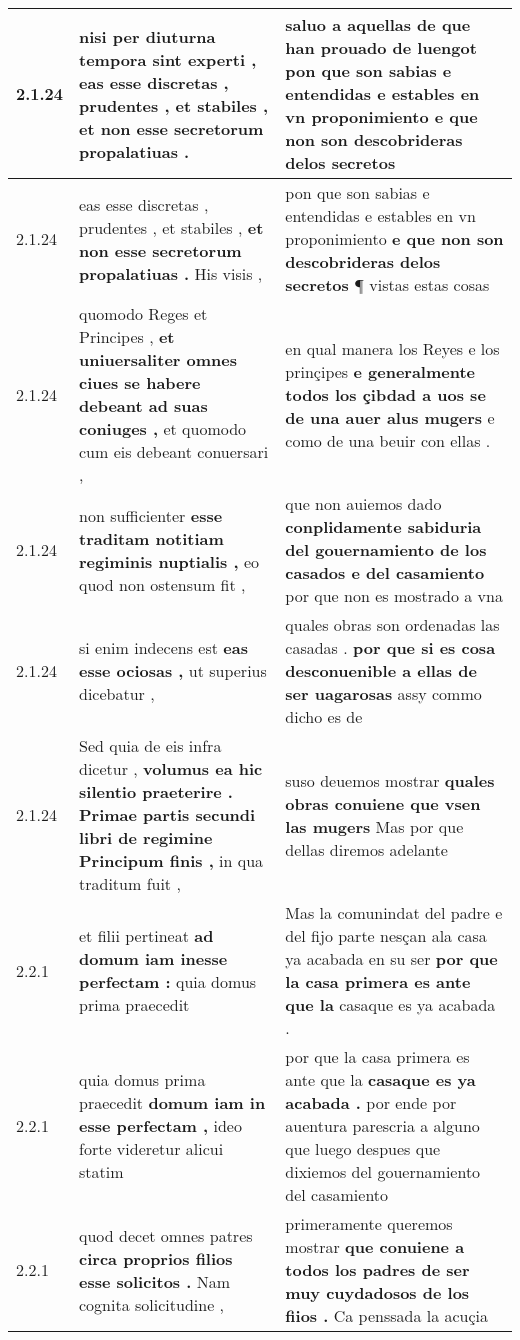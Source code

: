 \begin{tabular}{|p{1cm}|p{6.5cm}|p{6.5cm}|}
2.1.24 & nisi per diuturna tempora sint experti , \textbf{ eas esse discretas , prudentes , et stabiles , } et non esse secretorum propalatiuas . & saluo a aquellas de que han prouado de luengot \textbf{ pon que son sabias e entendidas e estables en vn proponimiento } e que non son descobrideras delos secretos \\\hline
2.1.24 & eas esse discretas , prudentes , et stabiles , \textbf{ et non esse secretorum propalatiuas . } His visis , & pon que son sabias e entendidas e estables en vn proponimiento \textbf{ e que non son descobrideras delos secretos } ¶ vistas estas cosas \\\hline
2.1.24 & quomodo Reges et Principes , \textbf{ et uniuersaliter omnes ciues se habere debeant ad suas coniuges , } et quomodo cum eis debeant conuersari , & en qual manera los Reyes e los prinçipes \textbf{ e generalmente todos los çibdad a uos se de una auer alus mugers } e como de una beuir con ellas . \\\hline
2.1.24 & non sufficienter \textbf{ esse traditam notitiam regiminis nuptialis , } eo quod non ostensum fit , & que non auiemos dado \textbf{ conplidamente sabiduria del gouernamiento de los casados e del casamiento } por que non es mostrado a vna \\\hline
2.1.24 & si enim indecens est \textbf{ eas esse ociosas , } ut superius dicebatur , & quales obras son ordenadas las casadas . \textbf{ por que si es cosa desconuenible a ellas de ser uagarosas } assy commo dicho es de \\\hline
2.1.24 & Sed quia de eis infra dicetur , \textbf{ volumus ea hic silentio praeterire . Primae partis secundi libri de regimine Principum finis , } in qua traditum fuit , & suso deuemos mostrar \textbf{ quales obras conuiene que vsen las mugers } Mas por que dellas diremos adelante \\\hline
2.2.1 & et filii pertineat \textbf{ ad domum iam inesse perfectam : } quia domus prima praecedit & Mas la comunindat del padre e del fijo parte nesçan ala casa ya acabada en su ser \textbf{ por que la casa primera es ante que la } casaque es ya acabada . \\\hline
2.2.1 & quia domus prima praecedit \textbf{ domum iam in esse perfectam , } ideo forte videretur alicui statim & por que la casa primera es ante que la \textbf{ casaque es ya acabada . } por ende por auentura parescria a alguno que luego despues que dixiemos del gouernamiento del casamiento \\\hline
2.2.1 & quod decet omnes patres \textbf{ circa proprios filios esse solicitos . } Nam cognita solicitudine , & primeramente queremos mostrar \textbf{ que conuiene a todos los padres de ser muy cuydadosos de los fiios . } Ca penssada la acuçia \\\hline

\end{tabular}
